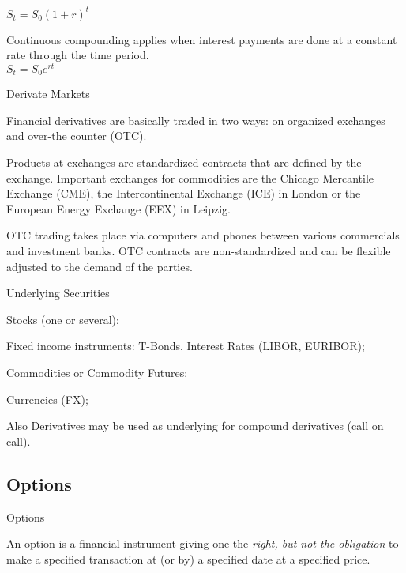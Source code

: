 	$S_t = S_0 (1+r)^t$



	Continuous compounding applies when interest payments are done at a constant rate through the time period. \\


	$S_t = S_0e^{rt}$

{Derivate Markets}






	Financial derivatives are basically traded in two ways: on organized exchanges and over-the counter (OTC).


	Products at exchanges are standardized contracts that are defined by the exchange. Important exchanges for commodities are the Chicago Mercantile Exchange (CME), the Intercontinental Exchange (ICE) in London or the European Energy Exchange (EEX) in Leipzig.


	OTC trading takes place via computers and phones between various commercials and investment banks. OTC contracts are non-standardized and can be flexible adjusted to the demand of the parties.





{Underlying Securities}







	Stocks (one or several);


	Fixed income instruments: T-Bonds, Interest Rates (LIBOR, EURIBOR);


	Commodities or Commodity Futures;


	Currencies (FX);


	Also Derivatives may be used as underlying for compound derivatives (call on call).





\subsection{Options}

{Options}







	An option is a financial instrument giving one the {\it right, but
not the obligation} to make a specified transaction at (or by) a
specified date at a specified price.


